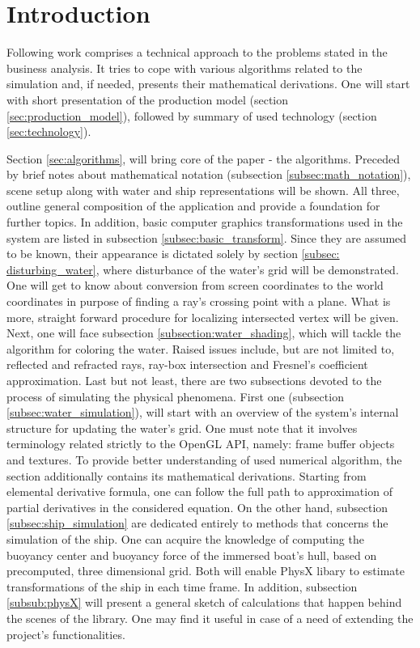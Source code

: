 \documentclass{report}
\begin{document}
\section{Introduction}
Following work comprises a technical approach to the problems stated in the business analysis. It tries to cope with various algorithms related to the simulation and, if needed, presents their mathematical derivations. One will start with short presentation of the production model (section \ref{sec:production_model}), followed by summary of used technology (section \ref{sec:technology}).

Section \ref{sec:algorithms}, will bring core of the paper - the algorithms. Preceded by brief notes about mathematical notation (subsection \ref{subsec:math_notation}), scene setup along with water and ship representations will be shown. All three, outline general composition of the application and provide a foundation for further topics. In addition, basic computer graphics transformations used in the system are listed in subsection \ref{subsec:basic_transform}. Since they are assumed to be known, their appearance is dictated solely by section \ref{subsec: disturbing_water}, where disturbance of the water's grid will be demonstrated. One will get to know about conversion from screen coordinates to the world coordinates in purpose of finding a ray's crossing point with a plane. What is more, straight forward procedure for localizing intersected vertex will be given. Next, one will face subsection \ref{subsection:water_shading}, which will tackle the algorithm for coloring the water. Raised issues include, but are not limited to, reflected and refracted rays, ray-box intersection and Fresnel's coefficient approximation. Last but not least, there are two subsections devoted to the process of simulating the physical phenomena. First one (subsection \ref{subsec:water_simulation}), will start with an overview of the system's internal structure for updating the water's grid. One must note that it involves terminology related strictly to the OpenGL API, namely: frame buffer objects and textures. To provide better understanding of used numerical algorithm, the section additionally contains its mathematical derivations. Starting from elemental derivative formula, one can follow the full path to approximation of partial derivatives in the considered equation. On the other hand, subsection \ref{subsec:ship_simulation} are dedicated entirely to methods that concerns the simulation of the ship. One can acquire the knowledge of computing the buoyancy center and buoyancy force of the immersed boat's hull, based on precomputed, three dimensional grid. Both will enable PhysX libary to estimate transformations of the ship in each time frame. In addition, subsection \ref{subsub:physX} will present a general sketch of calculations that happen behind the scenes of the library. One may find it useful in case of a need of extending the project's functionalities.
\end{document}
